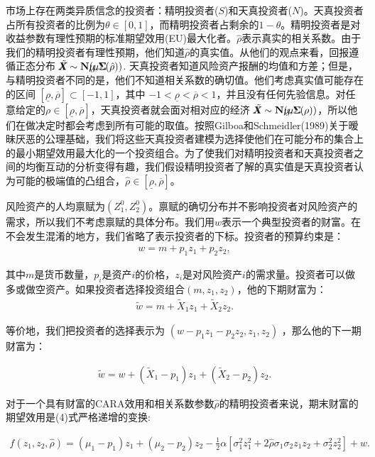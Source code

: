 \documentclass[10.0pt]{article}
\begin{document}
市场上存在两类异质信念的投资者：精明投资者($S$)和天真投资者($N$)。天真投资者占所有投资者的比例为$ \theta \in [0, 1]$，而精明投资者占剩余的$ 1 - \theta $。精明投资者是对收益参数有理性预期的标准期望效用(EU)最大化者。$ \hat \rho $表示真实的相关系数。由于我们的精明投资者有理性预期，他们知道$ \hat \rho $的真实值。从他们的观点来看，回报遵循正态分布 $ \tilde X \!\!\!\!\!\! X \sim {\bf N} (\mu \!\!\!\!\!\! \mu, \Sigma \!\!\!\!\! \Sigma (\hat \rho)) $. 天真投资者知道风险资产报酬的均值和方差；但是，与精明投资者不同的是，他们不知道相关系数的确切值。他们考虑真实值可能存在的区间 $ [\underline{\rho}, \overline{\rho}] \subset [- 1, 1] $，其中 $ - 1 < \underline{\rho} < \overline{\rho} < 1 $，并且没有任何先验信息。对任意给定的$ \rho \in [\underline{\rho}, \overline{\rho}] $，天真投资者就会面对相对应的经济  $ \tilde X \!\!\!\!\!\! X \sim {\bf N} (\mu \!\!\!\!\!\! \mu, \Sigma \!\!\!\!\! \Sigma (\rho)) $，所以他们在做决定时都会考虑到所有可能的取值。按照Gilboa和Schmeidler(1989)关于暧昧厌恶的公理基础，我们将这些天真投资者建模为选择使他们在可能分布的集合上的最小期望效用最大化的一个投资组合。为了使我们对精明投资者和天真投资者之间的均衡互动的分析变得有趣，我们假设精明投资者了解的真实值是天真投资者认为可能的极端值的凸组合，$ \hat \rho \in [\underline{\rho}, \overline{\rho}] $。


风险资产的人均禀赋为$ (Z^0_1, Z^0_2) $。禀赋的确切分布并不影响投资者对风险资产的需求，所以我们不考虑禀赋的具体分布。我们用$w$表示一个典型投资者的财富。在不会发生混淆的地方，我们省略了表示投资者的下标。投资者的预算约束是：
\begin{eqnarray}
w = m + p_1 z_1 + p_2 z_2,
\end{eqnarray}

其中$m$是货币数量，$p_i$是资产$i$的价格，$z_i$是对风险资产$i$的需求量。投资者可以做多或做空资产。如果投资者选择投资组合$ (m, z_1, z_2) $，他的下期财富为：
\begin{eqnarray}
\tilde w = m + \tilde X_1 z_1 + \tilde X_2 z_2.
\end{eqnarray}

等价地，我们把投资者的选择表示为 $ (w - p_1 z_1 - p_2 z_2, z_1, z_2) $ ，那么他的下一期财富为：

\begin{eqnarray*}
\tilde{w}  = w + (\tilde{X}_1 - p_1) z_1 + (\tilde{X}_2 - p_2) z_2.
\end{eqnarray*}


对于一个具有财富的CARA效用和相关系数参数$ \hat \rho $的精明投资者来说，期末财富的期望效用是(4)式严格递增的变换:

\begin{eqnarray}
f (z_1, z_2, \hat{\rho}) = (\mu_1 - p_1) z_1 + (\mu_2 - p_2) z_2 - \frac12 \alpha \left[ \sigma_1^2 z_1^2 + 2 \hat{\rho} \sigma_1 \sigma_2 z_1 z_2 + \sigma_2^2 z_2^2 \right] + w.
\end{eqnarray}
\end{document}
